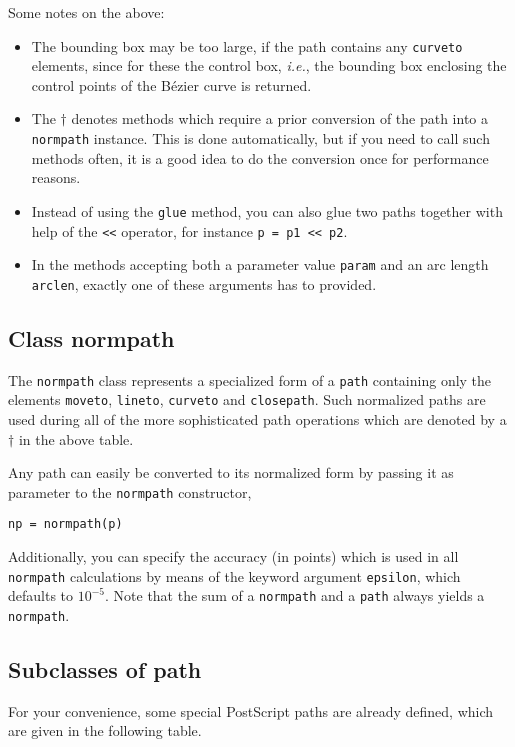 Some notes on the above:
\begin{itemize}
\item The bounding box may be too large, if the path contains any
  \texttt{curveto} elements, since for these the control box,
  \textit{i.e.}, the bounding box enclosing the control points of
  the B\'ezier curve is returned.
\item The $\dagger$ denotes methods which require a prior
  conversion of the path into a \verb|normpath| instance. This is
  done automatically, but if you need to call such methods often,
  it is a good idea to do the conversion once for performance reasons.
\item Instead of using the \verb|glue| method, you can also glue two
paths together with help of the \verb|<<| operator, for instance
\verb|p = p1 << p2|.
\item In the methods accepting both a parameter value \verb|param| and
  an arc length \verb|arclen|, exactly one of these arguments has to
  provided.
\end{itemize}

\subsection{Class normpath}

The \texttt{normpath} class represents a specialized form of a
\texttt{path} containing only the elements \verb|moveto|,
\verb|lineto|, \verb|curveto| and \verb|closepath|. Such normalized
paths are used during all of the more sophisticated path operations
which are denoted by a $\dagger$ in the above table.


Any path can easily be converted to its normalized form by passing it
as parameter to the \texttt{normpath} constructor,
\begin{verbatim}
np = normpath(p)
\end{verbatim}
Additionally, you can specify the accuracy (in points) which is used
in all \verb|normpath| calculations by means of the keyword argument
\verb|epsilon|, which defaults to $10^{-5}$.  Note that the sum of a
\verb|normpath| and a \verb|path| always yields a \verb|normpath|.

\subsection{Subclasses of path}

For your convenience, some special PostScript paths are already defined, which
are given in the following table.

